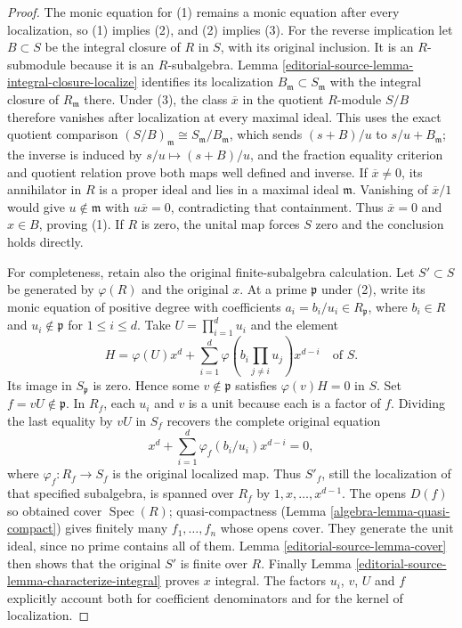 \begin{proof}
The monic equation for (1) remains a monic equation after every
localization, so (1) implies (2), and (2) implies (3).
For the reverse implication let $B\subset S$ be the integral
closure of $R$ in $S$, with its original inclusion. It is an
$R$-submodule because it is an $R$-subalgebra. Lemma
\ref{editorial-source-lemma-integral-closure-localize} identifies its localization
$B_{\mathfrak m}\subset S_{\mathfrak m}$ with the integral closure
of $R_{\mathfrak m}$ there. Under (3), the class $\overline x$
in the quotient $R$-module $S/B$ therefore vanishes after localization
at every maximal ideal. This uses the exact quotient comparison
$(S/B)_{\mathfrak m}\cong S_{\mathfrak m}/B_{\mathfrak m}$,
which sends $(s+B)/u$ to $s/u+B_{\mathfrak m}$; the inverse is
induced by $s/u\mapsto(s+B)/u$, and the fraction equality criterion
and quotient relation prove both maps well defined and inverse.
If $\overline x\ne0$, its annihilator in $R$ is a proper ideal
and lies in a maximal ideal $\mathfrak m$. Vanishing of
$\overline x/1$ would give $u\notin\mathfrak m$ with
$u\overline x=0$, contradicting that containment. Thus
$\overline x=0$ and $x\in B$, proving (1). If $R$ is zero,
the unital map forces $S$ zero and the conclusion holds directly.

For completeness, retain also the original finite-subalgebra
calculation. Let $S'\subset S$ be generated by $\varphi(R)$ and
the original $x$. At a prime $\mathfrak p$ under (2), write its
monic equation of positive degree with coefficients
$a_i=b_i/u_i\in R_{\mathfrak p}$,
where $b_i\in R$ and $u_i\notin\mathfrak p$ for $1\leq i\leq d$.
Take $U=\prod_{i=1}^d u_i$ and the element
$$
H=\varphi(U)x^d+
\sum_{i=1}^d\varphi\left(b_i\prod_{j\ne i}u_j\right)x^{d-i}
\quad\text{of }S.
$$
Its image in $S_{\mathfrak p}$ is zero. Hence some
$v\notin\mathfrak p$ satisfies $\varphi(v)H=0$ in $S$.
Set $f=vU\notin\mathfrak p$. In $R_f$, each $u_i$ and $v$
is a unit because each is a factor of $f$. Dividing the last
equality by $vU$ in $S_f$ recovers the complete original equation
$$
x^d+\sum_{i=1}^d\varphi_f(b_i/u_i)x^{d-i}=0,
$$
where $\varphi_f:R_f\to S_f$ is the original localized map.
Thus $S'_f$, still the localization of that specified subalgebra,
is spanned over $R_f$ by $1,x,\ldots,x^{d-1}$.
The opens $D(f)$ so obtained cover $\operatorname{Spec}(R)$;
quasi-compactness (Lemma \ref{algebra-lemma-quasi-compact}) gives finitely
many $f_1,\ldots,f_n$ whose opens cover. They generate the unit
ideal, since no prime contains all of them. Lemma \ref{editorial-source-lemma-cover}
then shows that the original $S'$ is finite over $R$. Finally
Lemma \ref{editorial-source-lemma-characterize-integral} proves $x$ integral.
The factors $u_i$, $v$, $U$ and $f$ explicitly account both for
coefficient denominators and for the kernel of localization.
\end{proof}


